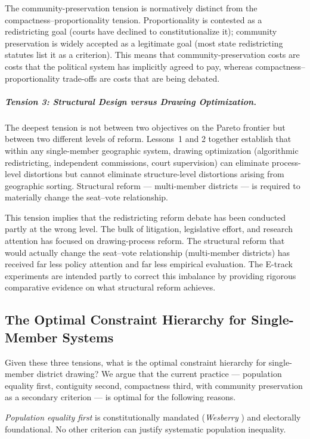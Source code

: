 The community-preservation tension is normatively distinct from the
compactness--proportionality tension.  Proportionality is contested as a
redistricting goal (courts have declined to constitutionalize it); community
preservation is widely accepted as a legitimate goal (most state redistricting
statutes list it as a criterion).  This means that community-preservation
costs are costs that the political system has implicitly agreed to pay, whereas
compactness--proportionality trade-offs are costs that are being debated.

\subparagraph{Tension 3: Structural Design versus Drawing Optimization.}
The deepest tension is not between two objectives on the Pareto frontier but
between two different levels of reform.  Lessons~1 and 2 together establish
that within any single-member geographic system, drawing optimization
(algorithmic redistricting, independent commissions, court supervision) can
eliminate process-level distortions but cannot eliminate structure-level
distortions arising from geographic sorting.  Structural reform --- multi-member
districts --- is required to materially change the seat--vote relationship.

This tension implies that the redistricting reform debate has been conducted
partly at the wrong level.  The bulk of litigation, legislative effort, and
research attention has focused on drawing-process reform.  The structural reform
that would actually change the seat--vote relationship (multi-member districts)
has received far less policy attention and far less empirical evaluation.
The E-track experiments are intended partly to correct this imbalance by
providing rigorous comparative evidence on what structural reform achieves.

\subsection{The Optimal Constraint Hierarchy for Single-Member Systems}

Given these three tensions, what is the optimal constraint hierarchy for
single-member district drawing?  We argue that the current practice ---
population equality first, contiguity second, compactness third, with
community preservation as a secondary criterion --- is optimal for the following
reasons.

\emph{Population equality first} is constitutionally mandated (\emph{Wesberry}
\citep{wesberry1964}) and electorally foundational.  No other criterion can
justify systematic population inequality.

